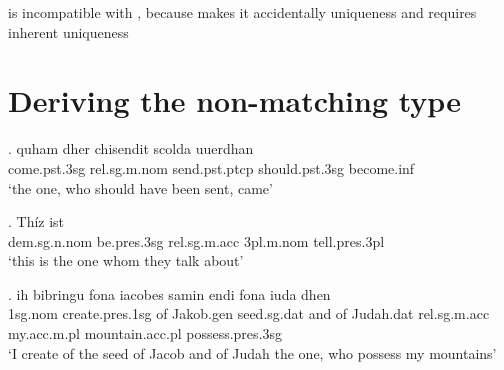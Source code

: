  is incompatible with , because  makes it accidentally uniqueness and  requires inherent uniqueness



\section{Deriving the non-matching type}\label{sec:deriving-nonmatching}

\exg. quham dher chisendit scolda uuerdhan\\
 come.\ac{pst}.3\ac{sg}\scsub{[nom]} \ac{rel}.\ac{sg}.\ac{m}.\ac{nom} send.\ac{pst}.\ac{ptcp}\scsub{[nom]} should.\ac{pst}.3\ac{sg} become.\ac{inf}\\
 `the one, who should have been sent, came' \label{ex:ohg-nom-nom-rep-workout}

\exg. Thíz ist   \\
\ac{dem}.\ac{sg}.\ac{n}.\ac{nom} be.\ac{pres}.3\ac{sg}\scsub{[nom]} \ac{rel}.\ac{sg}.\ac{m}.\ac{acc} 3\ac{pl}.\ac{m}.\ac{nom} tell.\ac{pres}.3\ac{pl}\scsub{[acc]}\\
`this is the one whom they talk about' \label{ex:ohg-nom-acc-rep}

\exg. ih bibringu fona iacobes samin endi fona iuda dhen   \\
1\ac{sg}.\ac{nom} {create}.\ac{pres}.1\ac{sg}\scsub{[acc]} of Jakob.\ac{gen} seed.\ac{sg}.\ac{dat} and of Judah.\ac{dat} \ac{rel}.\ac{sg}.\ac{m}.\ac{acc} my.\ac{acc}.\ac{m}.\ac{pl} mountain.\ac{acc}.\ac{pl} possess.\ac{pres}.3\ac{sg}\scsub{[nom]}\\
`I create of the seed of Jacob and of Judah the one, who possess my mountains' \label{ex:ohg-acc-nom-rep}


